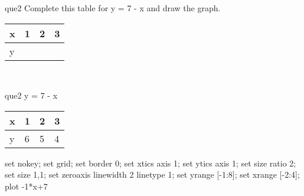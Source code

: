 \documentclass[13.5pt, varwidth=true]{beamer}
\begin{document}
\begin{frame}[shrink=19,fragile]
	\begin{beamercolorbox}[rounded=true, left, shadow=true,wd=14.8cm]{que2}
		 Complete this table for y = 7 - x and draw the graph. \\[0.3cm] \renewcommand{\arraystretch}{1.2}\begin{tabular}{|C|C|C|C|} \hline x & 1 & 2 & 3 \\ \hline y & & & \\ \hline \end{tabular}\\[0.3cm]
	\end{beamercolorbox}
\end{frame}
\begin{frame}[shrink=19,fragile]
	\begin{beamercolorbox}[rounded=true, left, shadow=true,wd=14.8cm]{que2}
		y = 7 - x\renewcommand{\arraystretch}{1.2}\begin{tabular}{|C|C|C|C|} \hline x & 1 & 2 & 3 \\ \hline y & 6 & 5 & 4\\ \hline \end{tabular}\begin{gnuplot}[terminal=pdf] set nokey; set grid; set border 0; set xtics axis 1; set ytics axis 1; set size ratio 2; set size 1,1; set zeroaxis linewidth 2 linetype 1; set yrange [-1:8]; set xrange [-2:4]; plot -1*x+7 \end{gnuplot}
	\end{beamercolorbox}
\end{frame}
\end{document}
